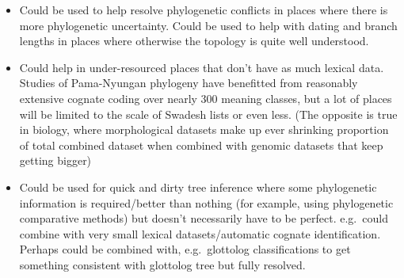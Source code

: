 \documentclass[]{article}
\providecommand{\tightlist}{%
  \setlength{\itemsep}{0pt}\setlength{\parskip}{0pt}}
\begin{document}
\begin{itemize}
\tightlist
\item
  Could be used to help resolve phylogenetic conflicts in places where there is more phylogenetic uncertainty. Could be used to help with dating and branch lengths in places where otherwise the topology is quite well understood.
\item
  Could help in under-resourced places that don't have as much lexical data. Studies of Pama-Nyungan phylogeny have benefitted from reasonably extensive cognate coding over nearly 300 meaning classes, but a lot of places will be limited to the scale of Swadesh lists or even less. (The opposite is true in biology, where morphological datasets make up ever shrinking proportion of total combined dataset when combined with genomic datasets that keep getting bigger)
\item
  Could be used for quick and dirty tree inference where some phylogenetic information is required/better than nothing (for example, using phylogenetic comparative methods) but doesn't necessarily have to be perfect. e.g.~could combine with very small lexical datasets/automatic cognate identification. Perhaps could be combined with, e.g.~glottolog classifications to get something consistent with glottolog tree but fully resolved.
\end{itemize}

\printbibliography
\end{document}
